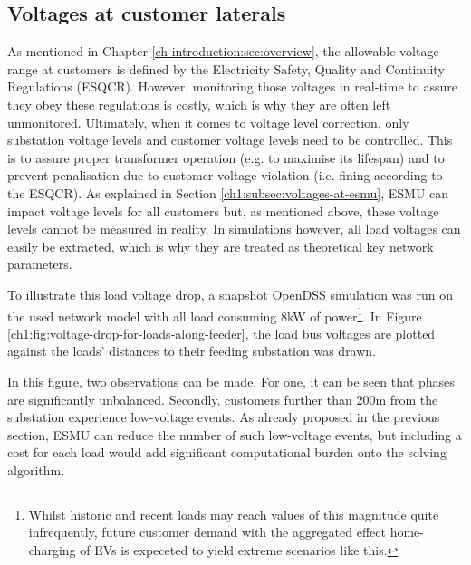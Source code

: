 \subsection{Voltages at customer laterals}
\label{ch1:subsec:voltages-at-customers}

As mentioned in Chapter \ref{ch-introduction:sec:overview}, the allowable voltage range at customers is defined by the Electricity Safety, Quality and Continuity Regulations (ESQCR).
However, monitoring those voltages in real-time to assure they obey these regulations is costly, which is why they are often left unmonitored.
Ultimately, when it comes to voltage level correction, only substation voltage levels and customer voltage levels need to be controlled.
This is to assure proper transformer operation (e.g. to maximise its lifespan) and to prevent penalisation due to customer voltage violation (i.e. fining according to the ESQCR).
As explained in Section \ref{ch1:subsec:voltages-at-esmu}, ESMU can impact voltage levels for all customers but, as mentioned above, these voltage levels cannot be measured in reality.
In simulations however, all load voltages can easily be extracted, which is why they are treated as theoretical key network parameters.

To illustrate this load voltage drop, a snapshot OpenDSS simulation was run on the used network model with all load consuming  8kW of power\footnote[1]{Whilst historic and recent loads may reach values of this magnitude quite infrequently, future customer demand with the aggregated effect home-charging of EVs is expeceted to yield extreme scenarios like this.}.
In Figure \ref{ch1:fig:voltage-drop-for-loads-along-feeder}, the load bus voltages are plotted against the loads' distances to their feeding substation was drawn.




In this figure, two observations can be made.
For one, it can be seen that phases are significantly unbalanced.
Secondly, customers further than 200m from the substation experience low-voltage events.
As already proposed in the previous section, ESMU can reduce the number of such low-voltage events, but including a cost for each load would add significant computational burden onto the solving algorithm.


